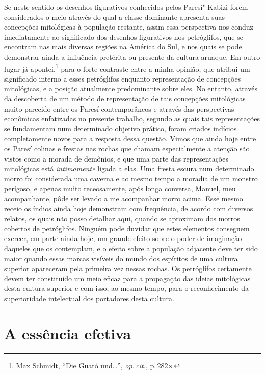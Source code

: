 Se neste sentido os desenhos figurativos conhecidos pelos Paresí"-Kabizi
forem considerados o meio através do qual a classe dominante apresenta
suas concepções mitológicas à população restante, assim essa
perspectiva nos conduz imediatamente ao significado dos desenhos
figurativos nos petróglifos, que se encontram nas mais diversas regiões
na América do Sul, e nos quais se pode demonstrar ainda a influência
pretérita ou presente da cultura aruaque. Em outro lugar já
apontei,\footnote{Max Schmidt, ``Die Guató und\ldots'', \textit{op.\,cit.}, p.\,282\,\textsc{s}.} para o forte
contraste entre a minha opinião, que atribui um significado interno a
esses petróglifos enquanto representação de concepções mitológicas, e a
posição atualmente predominante sobre eles. No entanto,
através da descoberta de um método de representação de tais concepções
mitológicas muito parecido entre os Paresí contemporâneos e através das
perspectivas econômicas enfatizadas no presente trabalho, segundo as
quais tais representações se fundamentam num determinado objetivo
prático, foram criados indícios completamente novos para a resposta
dessa questão. Vimos que ainda hoje entre os Paresí colinas e frestas
nas rochas que chamam especialmente a atenção são vistos como a morada
de demônios, e que uma parte das representações mitológicas está
\textit{intimamente} ligada a elas. Uma fresta escura num determinado morro foi
considerada uma caverna e ao mesmo tempo a moradia de um monstro
perigoso, e apenas muito receosamente, após longa conversa, Manuel, meu
acompanhante, pôde ser levado a me acompanhar morro acima. Esse mesmo
receio os índios ainda hoje demonstram com frequência, de acordo com
diversos relatos, os quais não posso detalhar aqui, quando se aproximam
dos morros cobertos de petróglifos. Ninguém pode duvidar que estes elementos 
conseguem exercer, em parte ainda hoje, um grande efeito
sobre o poder de imaginação daqueles que os contemplam, e o efeito
sobre a população adjacente deve ter sido maior quando essas marcas
visíveis do mundo dos espíritos de uma cultura superior apareceram pela
primeira vez nessas rochas. Os petróglifos certamente devem ter
constituído um meio eficaz para a propagação das ideias mitológicas
desta cultura superior e com isso, ao mesmo tempo, para o reconhecimento
da superioridade intelectual dos portadores desta cultura.



\chapter*{A essência efetiva\smallskip{}}

